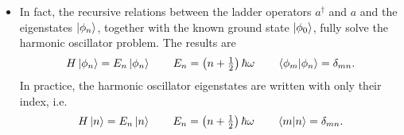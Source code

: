 \documentclass[11pt, a4paper]{article}
\begin{document}
\begin{itemize}
 	\item In fact, the recursive relations between the ladder operators $ a^{\dagger} $  and $ a $ and the eigenstates $ \ket{\phi_{n}} $, together with the known ground state $ \ket{\phi_{0}} $, fully solve the harmonic oscillator problem. The results are
 	\begin{equation*}
 		H\ket{\phi_{n}} = E_{n}\ket{\phi_{n}} \qquad E_{n} = \left(n + \tfrac{1}{2}\right)\hbar \omega \qquad \braket{\phi_{m}}{\phi_{n}} = \delta_{mn}.
 	\end{equation*}
    In practice, the harmonic oscillator eigenstates are written with only their index, i.e.
    \begin{equation*}
 		H\ket{n} = E_{n}\ket{n} \qquad E_{n} = \left(n + \tfrac{1}{2}\right)\hbar \omega \qquad \braket{m}{n} = \delta_{mn}.
    \end{equation*}
    
    
	 
\end{itemize}
\end{document}
